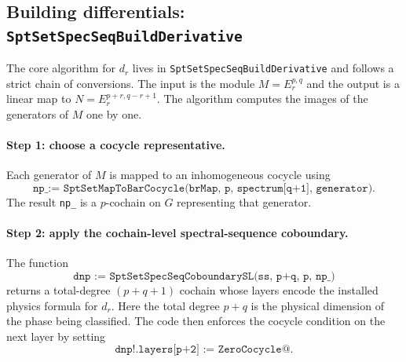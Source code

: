 \documentclass{SciPost}
\begin{document}
\subsection{Building differentials: \texttt{SptSetSpecSeqBuildDerivative}}

The core algorithm for $d_r$ lives in \texttt{SptSetSpecSeqBuildDerivative} and follows a strict chain of conversions.
The input is the module $M = E_r^{p,q}$ and the output is a linear map to $N = E_r^{p+r,q-r+1}$.
The algorithm computes the images of the generators of $M$ one by one.

\paragraph{Step 1: choose a cocycle representative.}
Each generator of $M$ is mapped to an inhomogeneous cocycle using
\begin{equation}
\texttt{np\_ := SptSetMapToBarCocycle(brMap, p, spectrum[q+1], generator)}.
\end{equation}
The result \texttt{np\_} is a $p$-cochain on $G$ representing that generator.

\paragraph{Step 2: apply the cochain-level spectral-sequence coboundary.}
The function
\begin{equation}
\texttt{dnp := SptSetSpecSeqCoboundarySL(ss, p+q, p, np\_)}
\end{equation}
returns a total-degree $(p+q+1)$ cochain whose layers encode the installed physics formula for $d_r$.
Here the total degree $p+q$ is the physical dimension of the phase being classified.
The code then enforces the cocycle condition on the next layer by setting
\begin{equation}
\texttt{dnp!.layers[p+2] := ZeroCocycle@}.
\end{equation}
\end{document}
